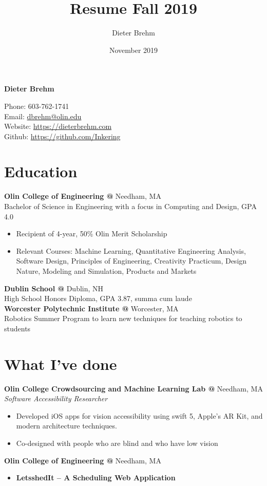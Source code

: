 \documentclass[10pt]{article} %
\title{Resume Fall 2019}
\author{Dieter Brehm}
\date{November 2019}
\begin{document}
{\LARGE\bfseries Dieter Brehm} %

Phone: 603-762-1741\\ %
Email: \href{mailto:dbrehm@olin.edu}{dbrehm@olin.edu}\\ %
Website: \href{https://dieterbrehm.com}{https://dieterbrehm.com}\\ %
Github: \href{https://github.com/Inkering}{https://github.com/Inkering}\\ %

\begin{minipage}[t]{0.8\textwidth}
\section*{Education}
\textbf{Olin College of Engineering @} \space Needham, MA\\
Bachelor of Science in Engineering with a focus in Computing and Design, GPA 4.0\\
\begin{itemize} [noitemsep,topsep=0pt]
  \item Recipient of 4-year, 50\% Olin Merit Scholarship
  \item Relevant Courses: Machine Learning, Quantitative Engineering Analysis, Software Design, Principles of Engineering, Creativity Practicum, Design Nature, Modeling and Simulation, Products and Markets
  \\
\end{itemize}
\textbf{Dublin School @} \space Dublin, NH\\
High School Honors Diploma, GPA 3.87, summa cum laude\\
\textbf{Worcester Polytechnic Institute @} \space Worcester, MA\\
Robotics Summer Program to learn new techniques for teaching robotics to students

\section*{What I've done}
\textbf{Olin College Crowdsourcing and Machine Learning Lab @} \space Needham, MA\\
\textit{Software Accessibility Researcher}\\
\begin{itemize} [noitemsep,topsep=0pt]
  \item Developed iOS apps for vision accessibility using swift 5, Apple’s AR Kit, and modern architecture techniques.
  \item Co-designed with people who are blind and who have low vision
  \\
\end{itemize}
\textbf{Olin College of Engineering @} \space Needham, MA\\
\begin{itemize} [noitemsep,topsep=0pt]
  \item {}\textbf{LetsshedIt – A Scheduling Web Application}


\end{itemize}
\end{minipage}
\end{document}
